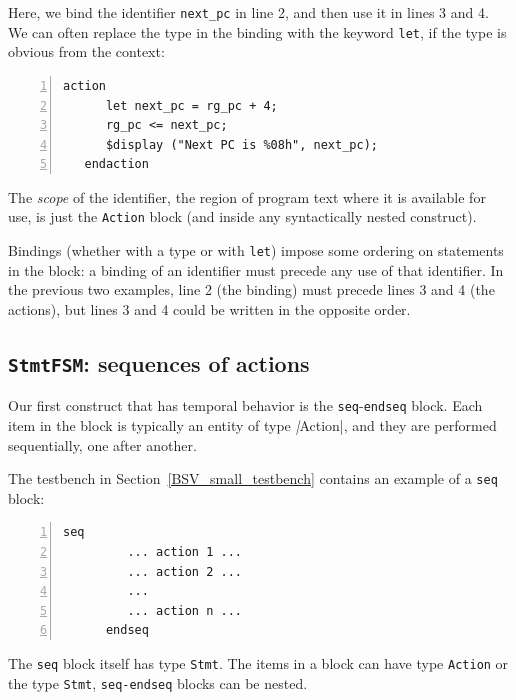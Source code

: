 Here, we bind the identifier \verb|next_pc| in line 2, and then use it
in lines 3 and 4.  We can often replace the type in the binding with
the keyword {\tt let}, if the type is obvious from the context:

{\small
\begin{Verbatim}[frame=single, numbers=left]
   action
      let next_pc = rg_pc + 4;
      rg_pc <= next_pc;
      $display ("Next PC is %08h", next_pc);
   endaction
\end{Verbatim}
}

The \emph{scope} of the identifier, {\ie} the region of program text
where it is available for use, is just the {\tt Action} block (and
inside any syntactically nested construct).

Bindings (whether with a type or with \verb|let|) impose some ordering
on statements in the block: a binding of an identifier must precede
any use of that identifier.  In the previous two examples, line 2 (the
binding) must precede lines 3 and 4 (the actions), but lines 3 and 4
could be written in the opposite order.


\subsection{{\tt StmtFSM}: sequences of actions}


Our first construct that has temporal behavior is the
\verb|seq|-\verb|endseq| block.  Each item in the block is typically
an entity of type \emph|Action|, and they are performed sequentially,
one after another.

The testbench in Section~\ref{BSV_small_testbench} contains an example
of a \verb|seq| block:

{\small
\begin{Verbatim}[frame=single, numbers=left]
      seq
         ... action 1 ...
         ... action 2 ...
         ...
         ... action n ...
      endseq
\end{Verbatim}
}


The \verb|seq| block itself has type \verb|Stmt|.  The items in a
block can have type \verb|Action| or the type \verb|Stmt|, {\ie}
\verb|seq-endseq| blocks can be nested.

